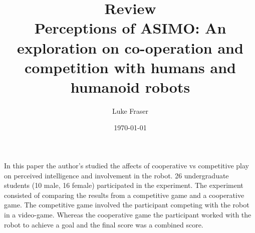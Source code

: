 \documentclass{article}
\begin{document}
\title{{\large Review} \\ Perceptions of ASIMO: An exploration on co-operation and competition with humans and humanoid robots}
\author{Luke Fraser}
\date{\today}
\maketitle

\begingroup
\renewcommand{\section}[2]{}


\endgroup

\section*{Summary}
In this paper the author's studied the affects of cooperative vs competitive play on perceived intelligence and involvement in the robot. 26 undergraduate students (10 male, 16 female) participated in the experiment. The experiment consisted of comparing the results from a competitive game and a cooperative game. The competitive game involved the participant competing with the robot in a video-game. Whereas the cooperative game the participant worked with the robot to achieve a goal and the final score was a combined score.
\section*{Strengths}

\section*{Critique}

\cite{Mutlu06perceptionsof}
\end{document}
